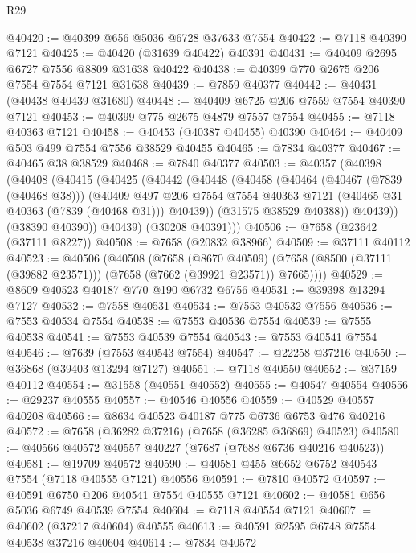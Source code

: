 \begin{lexlean}{R29}
\begin{coremodule}
@40420 := @40399 @656 @5036 @6728 @37633 @7554
@40422 := @7118 @40390 @7121
@40425 := @40420 (@31639 @40422) @40391
@40431 := @40409 @2695 @6727 @7556 @8809 @31638 @40422
@40438 := @40399 @770 @2675 @206 @7554 @7554 @7121 @31638
@40439 := @7859 @40377
@40442 := @40431 (@40438 @40439 @31680)
@40448 := @40409 @6725 @206 @7559 @7554 @40390 @7121
@40453 := @40399 @775 @2675 @4879 @7557 @7554
@40455 := @7118 @40363 @7121
@40458 := @40453 (@40387 @40455) @40390
@40464 := @40409 @503 @499 @7554 @7556 @38529 @40455
@40465 := @7834 @40377
@40467 := @40465 @38 @38529
@40468 := @7840 @40377
@40503 := @40357
    (@40398
      (@40408
        (@40415
          (@40425
            (@40442
              (@40448
                (@40458
                  (@40464
                    (@40467 (@7839 (@40468 @38)))
                    (@40409
                      @497
                      @206
                      @7554
                      @7554
                      @40363
                      @7121
                      (@40465 @31 @40363 (@7839 (@40468 @31)))
                      @40439))
                  (@31575 @38529 @40388))
                @40439))
            (@38390 @40390))
          @40439)
        (@30208 @40391)))
@40506 := @7658 (@23642 (@37111 @8227))
@40508 := @7658 (@20832 @38966)
@40509 := @37111 @40112
@40523 := @40506
    (@40508
      (@7658
        (@8670 @40509)
        (@7658 (@8500 (@37111 (@39882 @23571))) (@7658 (@7662 (@39921 @23571)) @7665))))
@40529 := @8609 @40523 @40187 @770 @190 @6732 @6756
@40531 := @39398 @13294 @7127
@40532 := @7558 @40531
@40534 := @7553 @40532 @7556
@40536 := @7553 @40534 @7554
@40538 := @7553 @40536 @7554
@40539 := @7555 @40538
@40541 := @7553 @40539 @7554
@40543 := @7553 @40541 @7554
@40546 := @7639 (@7553 @40543 @7554)
@40547 := @22258 @37216
@40550 := @36868 (@39403 @13294 @7127)
@40551 := @7118 @40550
@40552 := @37159 @40112
@40554 := @31558 (@40551 @40552)
@40555 := @40547 @40554
@40556 := @29237 @40555
@40557 := @40546 @40556
@40559 := @40529 @40557 @40208
@40566 := @8634 @40523 @40187 @775 @6736 @6753 @476 @40216
@40572 := @7658 (@36282 @37216) (@7658 (@36285 @36869) @40523)
@40580 := @40566 @40572 @40557 @40227 (@7687 (@7688 @6736 @40216 @40523))
@40581 := @19709 @40572
@40590 := @40581 @455 @6652 @6752 @40543 @7554 (@7118 @40555 @7121) @40556
@40591 := @7810 @40572
@40597 := @40591 @6750 @206 @40541 @7554 @40555 @7121
@40602 := @40581 @656 @5036 @6749 @40539 @7554
@40604 := @7118 @40554 @7121
@40607 := @40602 (@37217 @40604) @40555
@40613 := @40591 @2595 @6748 @7554 @40538 @37216 @40604
@40614 := @7834 @40572

\end{coremodule}
\end{lexlean}
